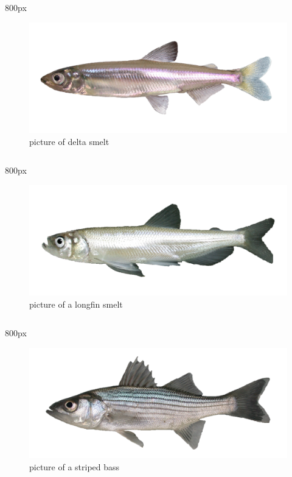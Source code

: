 \documentclass[
]{book}
\begin{document}
\begin{column}{800px\textwidth}
\begin{figure}

{\centering \includegraphics[width=29.17in]{figures/delta_smelt} 

}

\caption{picture of delta smelt}\label{fig:unnamed-chunk-136}
\end{figure}
\end{column}

\begin{column}{800px\textwidth}
\begin{figure}

{\centering \includegraphics[width=29.17in]{figures/longfin_smelt_adult} 

}

\caption{picture of a longfin smelt}\label{fig:unnamed-chunk-137}
\end{figure}
\end{column}

\begin{column}{800px\textwidth}
\begin{figure}

{\centering \includegraphics[width=29.17in]{figures/striped_bass_young_adult} 

}

\caption{picture of a striped bass}\label{fig:unnamed-chunk-138}
\end{figure}
\end{column}
\end{document}
